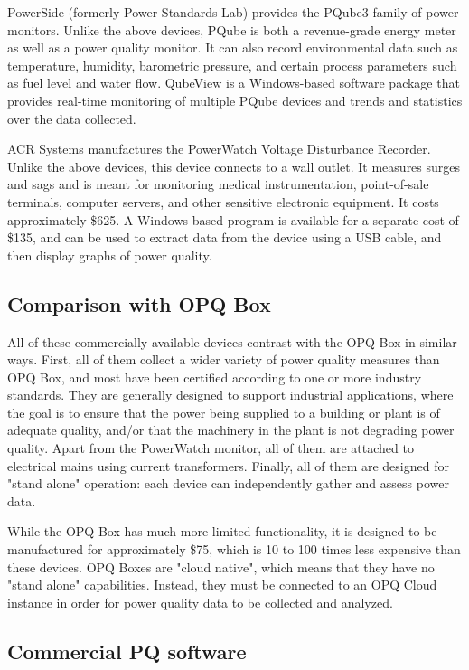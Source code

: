 PowerSide (formerly Power Standards Lab) \cite{powerside_powerside_2020} provides the PQube3 family of power monitors. Unlike the above devices, PQube is both a revenue-grade energy meter as well as a power quality monitor. It can also record environmental data such as temperature, humidity, barometric pressure, and certain process parameters such as fuel level and water flow. QubeView is a Windows-based software package that provides real-time monitoring of multiple PQube devices and trends and statistics over the data collected.

ACR Systems \cite{acr_acr_2020} manufactures the PowerWatch Voltage Disturbance Recorder. Unlike the above devices, this device connects to a wall outlet. It measures surges and sags and is meant for monitoring medical instrumentation, point-of-sale terminals, computer servers, and other sensitive electronic equipment. It costs approximately \$625. A Windows-based program is available for a separate cost of \$135, and can be used to extract data from the device using a USB cable, and then display graphs of power quality.

\subsection*{Comparison with OPQ Box}

All of these commercially available devices contrast with the OPQ Box in similar ways. First, all of them collect a wider variety of power quality measures than OPQ Box, and most have been certified according to one or more industry standards. They are generally designed to support industrial applications, where the goal is to ensure that the power being supplied to a building or plant is of adequate quality, and/or that the machinery in the plant is not degrading power quality. Apart from the PowerWatch monitor, all of them are attached to electrical mains using current transformers. Finally, all of them are designed for "stand alone" operation: each device can independently gather and assess power data.

While the OPQ Box has much more limited functionality, it is designed to be manufactured for approximately \$75, which is 10 to 100 times less expensive than these devices. OPQ Boxes are "cloud native", which means that they have no "stand alone" capabilities. Instead, they must be connected to an OPQ Cloud instance in order for power quality data to be collected and analyzed.

\subsection{Commercial PQ software}
\label{sec:commercial-pq-software}


